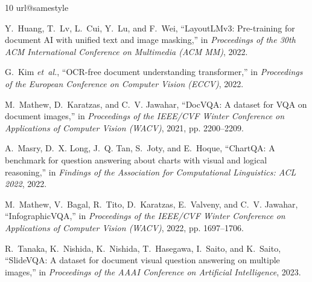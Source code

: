 \documentclass[conference]{IEEEtran}
\begin{document}
\begin{thebibliography}{10}
\providecommand{\url}[1]{#1}
\csname url@samestyle\endcsname
\providecommand{\newblock}{\relax}
\providecommand{\bibinfo}[2]{#2}
\providecommand{\BIBentrySTDinterwordspacing}{\spaceskip=0pt\relax}
\providecommand{\BIBentryALTinterwordstretchfactor}{4}
\providecommand{\BIBentryALTinterwordspacing}{\spaceskip=\fontdimen2\font plus
\BIBentryALTinterwordstretchfactor\fontdimen3\font minus
  \fontdimen4\font\relax}
\providecommand{\BIBforeignlanguage}[2]{{%
\expandafter\ifx\csname l@#1\endcsname\relax
\typeout{** WARNING: IEEEtran.bst: No hyphenation pattern has been}%
\typeout{** loaded for the language `#1'. Using the pattern for}%
\typeout{** the default language instead.}%
\else
\language=\csname l@#1\endcsname
\fi
#2}}
\providecommand{\BIBdecl}{\relax}
\BIBdecl

Y.~Huang, T.~Lv, L.~Cui, Y.~Lu, and F.~Wei, ``{LayoutLMv3}: Pre-training for
  document {AI} with unified text and image masking,'' in \emph{Proceedings of
  the 30th ACM International Conference on Multimedia (ACM MM)}, 2022.

G.~Kim \emph{et~al.}, ``{OCR}-free document understanding transformer,'' in
  \emph{Proceedings of the European Conference on Computer Vision (ECCV)},
  2022.

M.~Mathew, D.~Karatzas, and C.~V. Jawahar, ``{DocVQA}: A dataset for {VQA} on
  document images,'' in \emph{Proceedings of the IEEE/CVF Winter Conference on
  Applications of Computer Vision (WACV)}, 2021, pp. 2200--2209.

A.~Masry, D.~X. Long, J.~Q. Tan, S.~Joty, and E.~Hoque, ``{ChartQA}: A
  benchmark for question answering about charts with visual and logical
  reasoning,'' in \emph{Findings of the Association for Computational
  Linguistics: ACL 2022}, 2022.

M.~Mathew, V.~Bagal, R.~Tito, D.~Karatzas, E.~Valveny, and C.~V. Jawahar,
  ``{InfographicVQA},'' in \emph{Proceedings of the IEEE/CVF Winter Conference
  on Applications of Computer Vision (WACV)}, 2022, pp. 1697--1706.

R.~Tanaka, K.~Nishida, K.~Nishida, T.~Hasegawa, I.~Saito, and K.~Saito,
  ``{SlideVQA}: A dataset for document visual question answering on multiple
  images,'' in \emph{Proceedings of the AAAI Conference on Artificial
  Intelligence}, 2023.


\end{thebibliography}
\end{document}
